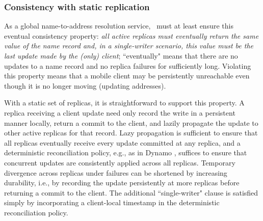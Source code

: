 \subsubsection{Consistency with static replication}
\label{sec:consistency}



As a global name-to-address resolution service, \auspice\ must at least ensure this eventual consistency property: {\em all active replicas must eventually return the same value of the name record and, in a single-writer scenario, this value must be the last update made by the (only) client}; ``eventually" means that there are no updates to a name record and no replica failures for sufficiently long. Violating this property means that a mobile client may be  persistently unreachable even though it is no longer moving (updating addresses). 

With a static set of replicas, it is straightforward to support this property. A replica receiving  a client update need only record the write in a persistent manner locally, return a commit to the client, and lazily propagate the update to other active replicas for that record. Lazy propagation is sufficient to ensure that all replicas eventually receive every update committed at any replica, and a deterministic reconciliation policy, e.g., as in Dynamo \cite{dynamo}, suffices to ensure that concurrent updates are consistently applied across all replicas. Temporary divergence across replicas under failures can be shortened by increasing durability, i.e., by recording the update persistently at more replicas before returning a commit to the client. The additional ``single-writer" clause is satisfied simply by incorporating a client-local timestamp in the deterministic reconciliation policy. 


